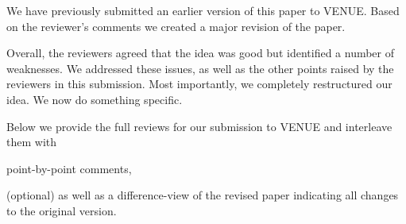 We have previously submitted an earlier version of this paper to VENUE. 
Based on the reviewer's comments we created a major revision of the paper. 

Overall, the reviewers agreed that the idea was good but identified a number of weaknesses.
We addressed these issues, as well as the other points raised by the reviewers in this submission. 
Most importantly, we completely restructured our idea.
We now do something specific.

Below we provide the full reviews for our submission to VENUE and interleave them with
\begin{xresponse}
point-by-point comments,
\end{xresponse}
(optional) as well as a difference-view of the revised paper indicating all changes to the original version.